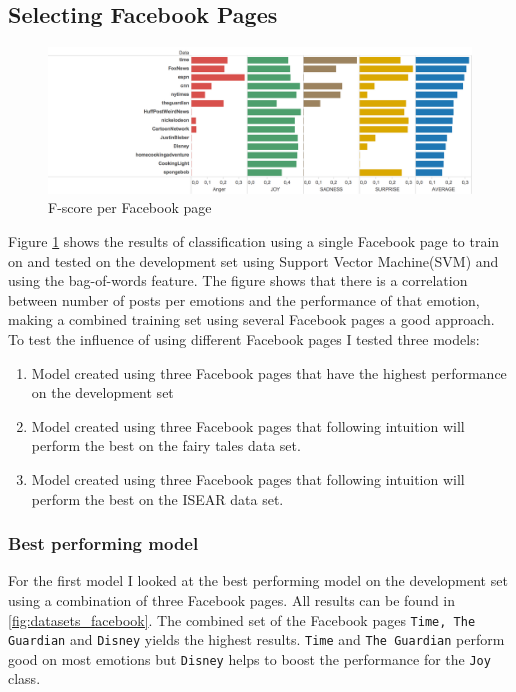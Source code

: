 \documentclass[11pt]{article}
\begin{document}
\subsection{Selecting Facebook Pages}
\begin{figure}[htb]
  \includegraphics[width=\linewidth]{dataset.png}
  \caption{F-score per Facebook page}
  \label{fig:dataset_facebook}
\end{figure}
Figure \ref{fig:dataset_facebook} shows the results of classification using a single Facebook page to train on and tested on the development set using Support Vector Machine(SVM) and using the bag-of-words feature. The figure shows that there is a correlation between number of posts per emotions and the performance of that emotion, making a combined training set using several Facebook pages a good approach. To test the influence of using different Facebook pages I tested three models: \\
\begin{enumerate}
\item Model created using three Facebook pages that have the highest performance on the development set
\item Model created using three Facebook pages that following intuition will perform the best on the fairy tales data set.
\item Model created using three Facebook pages that following intuition will perform the best on the ISEAR data set.
\end{enumerate}

\subsubsection{Best performing model}
For the first model I looked at the best performing model on the development set using a combination of three Facebook pages. All results can be found in \ref{fig:datasets_facebook}. The combined set of the Facebook pages \texttt{Time, The Guardian} and \texttt{Disney} yields the highest results. \texttt{Time} and \texttt{The Guardian} perform good on most emotions but \texttt{Disney} helps to boost the performance for the \texttt{Joy} class.
\end{document}
